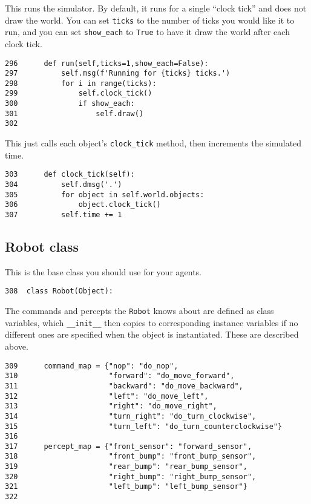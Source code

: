 \documentclass[11pt]{tufte-handout}
\begin{document}
This runs the simulator.  By default, it runs for a single ``clock tick'' and does not draw the world.  You can set \texttt{ticks} to the number of ticks you would like it to run, and you can set \texttt{show\_each} to \texttt{True} to have it draw the world after each clock tick.

\begin{verbatim}
296      def run(self,ticks=1,show_each=False):
297          self.msg(f'Running for {ticks} ticks.')
298          for i in range(ticks):
299              self.clock_tick()
300              if show_each:
301                  self.draw()
302  
\end{verbatim}

This just calls each object's \texttt{clock\_tick} method, then increments the simulated time.

\begin{verbatim}
303      def clock_tick(self):
304          self.dmsg('.')
305          for object in self.world.objects:
306              object.clock_tick()
307          self.time += 1
\end{verbatim}


\subsection{Robot class}
\label{sec:org7acbb92}

This is the base class you should use for your agents.

\begin{verbatim}
308  class Robot(Object):
\end{verbatim}

The commands and percepts the \texttt{Robot} knows about are defined as class variables, which \texttt{\_\_init\_\_} then copies to corresponding instance variables if no different ones are specified when the object is instantiated.  These are described above.

\begin{verbatim}
309      command_map = {"nop": "do_nop",
310                     "forward": "do_move_forward",
311                     "backward": "do_move_backward", 
312                     "left": "do_move_left", 
313                     "right": "do_move_right", 
314                     "turn_right": "do_turn_clockwise",
315                     "turn_left": "do_turn_counterclockwise"}
316  
317      percept_map = {"front_sensor": "forward_sensor", 
318                     "front_bump": "front_bump_sensor", 
319                     "rear_bump": "rear_bump_sensor", 
320                     "right_bump": "right_bump_sensor", 
321                     "left_bump": "left_bump_sensor"}
322  
\end{verbatim}
\end{document}
